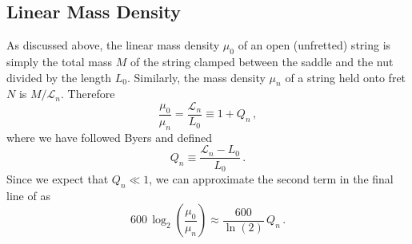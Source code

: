  \subsection{Linear Mass Density\label{sct:model_lmd}}
As discussed above, the linear mass density $\mu_0$ of an open (unfretted) string is simply the total mass $M$ of the string clamped between the saddle and the nut divided by the length $L_0$. Similarly, the mass density $\mu_n$ of a string held onto fret $N$ is $M/\mathcal{L}_n$. Therefore
 \begin{equation}
\frac{\mu_0}{\mu_n} = \frac{\mathcal{L}_n}{L_0} \equiv 1 + Q_n\, ,
 \end{equation}
where we have followed Byers and defined~\cite{ref:byers1996cgi,ref:varieschi2010icf}
 \begin{equation} \label{eqn:q_n_def}
Q_n \equiv \frac{\mathcal{L}_n - L_0}{L_0}\, .
 \end{equation}
Since we expect that $Q_n \ll 1$, we can approximate the second term in the final line of  as
 \begin{equation} \label{eqn:lmd_error}
600\, \log_2 \left(  \frac{\mu_0}{\mu_n} \right) \approx \frac{600}{\ln(2)}\, Q_n\, .
 \end{equation}



